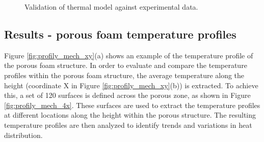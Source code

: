 \documentclass[a4paper]{article}
\begin{document}
\begin{figure}[H]
\begin{center} %


\caption{Validation of thermal model against experimental data.}
\label{fig:validate_thermal_model_x}
\end{center}
\end{figure}



\pagebreak

\subsection{Results - porous foam temperature profiles}
Figure \ref{fig:profily_mech_xy}(a) shows an example of the temperature profile of the porous foam structure.
In order to evaluate and compare the temperature profiles within the porous foam structure, the average temperature along the height (coordinate X in Figure \ref{fig:profily_mech_xy}(b)) is extracted.
To achieve this, a set of 120 surfaces is defined across the porous zone, as shown in Figure \ref{fig:profily_mech_4x}.
These surfaces are used to extract the temperature profiles at different locations along the height within the porous structure.
The resulting temperature profiles are then analyzed to identify trends and variations in heat distribution.
\end{document}
